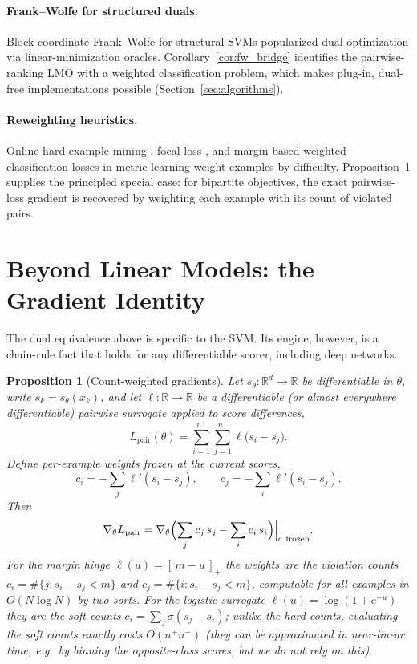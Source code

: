 \documentclass[11pt]{article}
\newcommand{\mathbbm}[1]{\mathds{#1}}
\newtheorem{proposition}{Proposition}
\theoremstyle{remark}
\begin{document}
\paragraph{Frank--Wolfe for structured duals.} Block-coordinate Frank--Wolfe
for structural SVMs \citep{lacostejulien2013} popularized dual optimization
via linear-minimization oracles. Corollary~\ref{cor:fw_bridge} identifies
the pairwise-ranking LMO with a weighted classification problem, which makes
plug-in, dual-free implementations possible
(Section~\ref{sec:algorithms}).

\paragraph{Reweighting heuristics.} Online hard example mining
\citep{shrivastava2016}, focal loss \citep{lin2017}, and margin-based
weighted-classification losses in metric learning \citep{deng2019} weight
examples by difficulty. Proposition~\ref{prop:gradient} supplies the
principled special case: for bipartite objectives, the exact pairwise-loss
gradient is recovered by weighting each example with its count of violated
pairs.



\section{Beyond Linear Models: the Gradient Identity}
\label{sec:gradient}

The dual equivalence above is specific to the SVM. Its engine, however, is a
chain-rule fact that holds for any differentiable scorer, including deep
networks.

\begin{proposition}[Count-weighted gradients]
\label{prop:gradient}
Let $s_\theta : \mathbbm{R}^d \to \mathbbm{R}$ be differentiable in
$\theta$, write $s_k = s_\theta(x_k)$, and let
$\ell : \mathbbm{R} \to \mathbbm{R}$ be a differentiable (or almost
everywhere differentiable) pairwise surrogate applied to score differences,
\[
L_{\mathrm{pair}}(\theta)
= \sum_{i=1}^{n^+} \sum_{j=1}^{n^-} \ell\bigl(s_i - s_j\bigr).
\]
Define per-example weights frozen at the current scores,
\[
c_i = -\sum_{j} \ell'(s_i - s_j), \qquad
c_j = -\sum_{i} \ell'(s_i - s_j).
\]
Then
\[
\nabla_\theta L_{\mathrm{pair}}
= \nabla_\theta \Bigl( \sum_j c_j\, s_j - \sum_i c_i\, s_i \Bigr)
\Big|_{c\ \mathrm{frozen}} .
\]
For the margin hinge $\ell(u) = [\,m - u\,]_+$ the weights are the
\emph{violation counts} $c_i = \#\{j : s_i - s_j < m\}$ and
$c_j = \#\{i : s_i - s_j < m\}$, computable for all examples in
$O(N \log N)$ by two sorts. For the logistic surrogate
$\ell(u) = \log(1 + e^{-u})$ they are the soft counts
$c_i = \sum_j \sigma(s_j - s_i)$; unlike the hard counts, evaluating the
soft counts exactly costs $O(n^+ n^-)$ (they can be approximated in
near-linear time, e.g.\ by binning the opposite-class scores, but we do not
rely on this).
\end{proposition}
\end{document}
